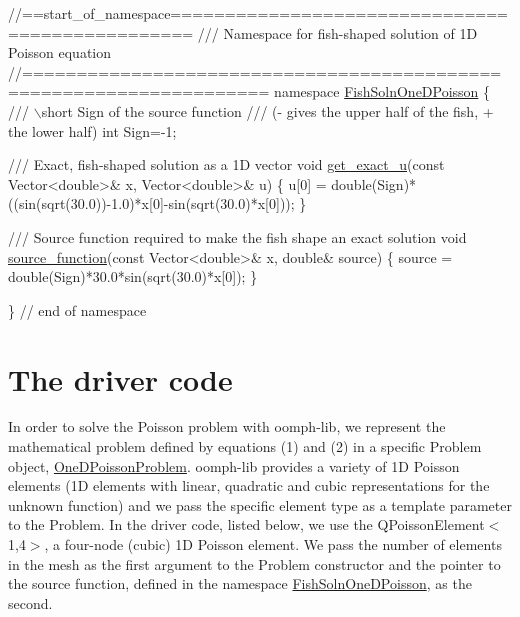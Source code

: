  
\begin{DoxyCodeInclude}
\textcolor{comment}{//==start\_of\_namespace================================================}
\textcolor{comment}{/// Namespace for fish-shaped solution of 1D Poisson equation}
\textcolor{comment}{}\textcolor{comment}{//====================================================================}
\textcolor{keyword}{namespace }\hyperlink{namespaceFishSolnOneDPoisson}{FishSolnOneDPoisson}
\{
\textcolor{comment}{}
\textcolor{comment}{ /// \(\backslash\)short Sign of the source function }
\textcolor{comment}{ /// (- gives the upper half of the fish, + the lower half)}
\textcolor{comment}{} \textcolor{keywordtype}{int} Sign=-1;

\textcolor{comment}{}
\textcolor{comment}{ /// Exact, fish-shaped solution as a 1D vector}
\textcolor{comment}{} \textcolor{keywordtype}{void} \hyperlink{namespaceFishSolnOneDPoisson_a52c9346f567cb68fe20268a592deb4bc}{get\_exact\_u}(\textcolor{keyword}{const} Vector<double>& x, Vector<double>& u)
 \{
  u[0] = double(Sign)*((sin(sqrt(30.0))-1.0)*x[0]-sin(sqrt(30.0)*x[0]));
 \}

\textcolor{comment}{}
\textcolor{comment}{ /// Source function required to make the fish shape an exact solution }
\textcolor{comment}{} \textcolor{keywordtype}{void} \hyperlink{namespaceFishSolnOneDPoisson_afd2f5aef6b8868526dbf8e74d379697f}{source\_function}(\textcolor{keyword}{const} Vector<double>& x, \textcolor{keywordtype}{double}& source)
 \{
  source = double(Sign)*30.0*sin(sqrt(30.0)*x[0]);
 \}

\} \textcolor{comment}{// end of namespace}

\end{DoxyCodeInclude}




 

\hypertarget{index_main}{}\section{The driver code}\label{index_main}
In order to solve the Poisson problem with {\ttfamily oomph-\/lib}, we represent the mathematical problem defined by equations (1) and (2) in a specific {\ttfamily Problem} object, {\ttfamily \hyperlink{classOneDPoissonProblem}{One\+D\+Poisson\+Problem}}. {\ttfamily oomph-\/lib} provides a variety of 1D Poisson elements (1D elements with linear, quadratic and cubic representations for the unknown function) and we pass the specific element type as a template parameter to the {\ttfamily Problem}. In the driver code, listed below, we use the {\ttfamily Q\+Poisson\+Element$<$1,4$>$}, a four-\/node (cubic) 1D Poisson element. We pass the number of elements in the mesh as the first argument to the {\ttfamily Problem} constructor and the pointer to the source function, defined in the namespace {\ttfamily \hyperlink{namespaceFishSolnOneDPoisson}{Fish\+Soln\+One\+D\+Poisson}}, as the second.

